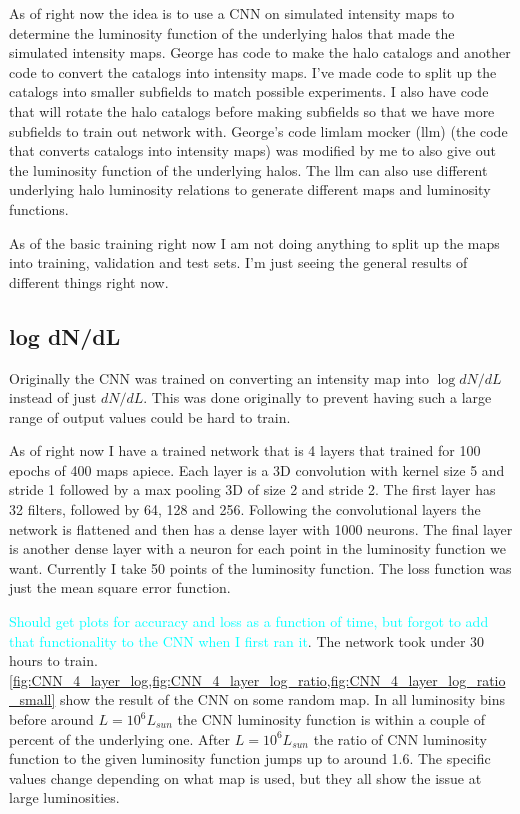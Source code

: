 \documentclass{article}
\newcommand{\dnp}[1]{\textcolor{cyan}{#1}}
\begin{document}
		As of right now the idea is to use a CNN on simulated intensity maps to determine the luminosity function of the underlying halos that made the simulated intensity maps.  George has code to make the halo catalogs and another code to convert the catalogs into intensity maps.  I've made code to split up the catalogs into smaller subfields to match possible experiments.  I also have code that will rotate the halo catalogs before making subfields so that we have more subfields to train out network with.  George's code limlam mocker (llm) (the code that converts catalogs into intensity maps) was modified by me to also give out the luminosity function of the underlying halos.  The llm can also use different underlying halo luminosity relations to generate different maps and luminosity functions.

		As of the basic training right now I am not doing anything to split up the maps into training, validation and test sets.  I'm just seeing the general results of different things right now.

		\subsection{log dN/dL} \label{sec:logValue}
			Originally the CNN was trained on converting an intensity map into \(\log dN/dL\) instead of just \(dN/dL\).  This was done originally to prevent having such a large range of output values could be hard to train.

			As of right now I have a trained network that is 4 layers that trained for 100 epochs of 400 maps apiece.  Each layer is a 3D convolution with kernel size 5 and stride 1 followed by a max pooling 3D of size 2 and stride 2.  The first layer has 32 filters, followed by 64, 128 and 256.  Following the convolutional layers the network is flattened and then has a dense layer with 1000 neurons.  The final layer is another dense layer with a neuron for each point in the luminosity function we want.  Currently I take 50 points of the luminosity function.  The loss function was just the mean square error function.

			\dnp{Should get plots for accuracy and loss as a function of time, but forgot to add that functionality to the CNN when I first ran it}.  The network took under 30 hours to train.  \cref{fig:CNN_4_layer_log,fig:CNN_4_layer_log_ratio,fig:CNN_4_layer_log_ratio_small} show the result of the CNN on some random map.  In all luminosity bins before around \(L = 10^6 L_{sun}\) the CNN luminosity function is within a couple of percent of the underlying one.  After \(L = 10^6 L_{sun}\) the ratio of CNN luminosity function to the given luminosity function jumps up to around 1.6.  The specific values change depending on what map is used, but they all show the issue at large luminosities.
\end{document}
